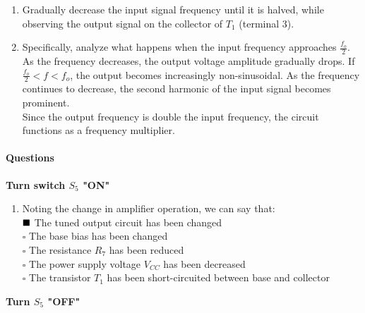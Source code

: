 \documentclass[12pt,a4paper]{article}
\begin{document}
\begin{enumerate}
        \item Gradually decrease the input signal frequency until it is halved, while observing the output signal on the collector of $T_1$ (terminal 3).
        \item Specifically, analyze what happens when the input frequency approaches \( \frac{f_o}{2} \). \\
        As the frequency decreases, the output voltage amplitude gradually drops. If \( \frac{f_o}{2} < f < f_o \), the output becomes increasingly non-sinusoidal. As the frequency continues to decrease, the second harmonic of the input signal becomes prominent. \\
        Since the output frequency is double the input frequency, the circuit functions as a frequency multiplier.
    \end{enumerate}

    \paragraph{Questions}

    \textbf{Turn switch $S_5$ "ON"}

    \begin{enumerate}
        \item Noting the change in amplifier operation, we can say that: \\
        \(\textcolor{black}{\blacksquare}\) The tuned output circuit has been changed \\
        \(\square\) The base bias has been changed \\
        \(\square\) The resistance $R_7$ has been reduced \\
        \(\square\) The power supply voltage \(V_{CC}\) has been decreased \\
        \(\square\) The transistor $T_1$ has been short-circuited between base and collector
    \end{enumerate}

    \textbf{Turn $S_5$ "OFF"}
\end{document}
